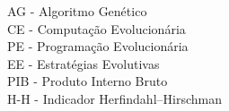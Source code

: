 \listafiguras
 
\listatabelas
 
\listasiglas
	{%
		AG - Algoritmo Genético \\
		CE - Computação Evolucionária \\
		PE - Programação Evolucionária \\
		EE - Estratégias Evolutivas \\
		PIB - Produto Interno Bruto \\
		H-H - Indicador Herfindahl–Hirschman
	}

\sumario

\newpage




